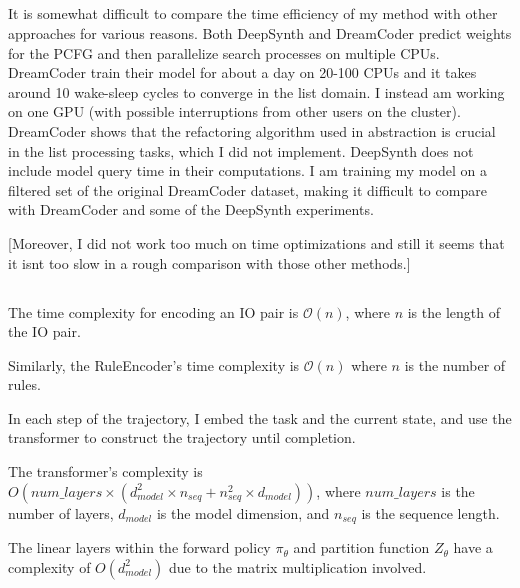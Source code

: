 \subsection{}
It is somewhat difficult to compare the time efficiency of my method with other approaches for various reasons. 
Both DeepSynth and DreamCoder predict weights for the PCFG and then parallelize search processes on multiple CPUs. DreamCoder train their model for about a day on 20-100 CPUs and it takes around 10 wake-sleep cycles to converge in the list domain. I instead am working on one GPU (with possible interruptions from other users on the cluster). DreamCoder shows that the refactoring algorithm used in abstraction is crucial in the list processing tasks, which I did not implement.
DeepSynth does not include model query time in their computations.
I am training my model on a filtered set of the original DreamCoder dataset, making it difficult to compare with DreamCoder and some of the DeepSynth experiments. 

[Moreover, I did not work too much on time optimizations and still it seems that it isnt too slow in a rough comparison with those other methods.]









\subsection{}


The time complexity for encoding an IO pair is \(\mathcal{O}(n)\), where \(n\) is the length of the IO pair. 

Similarly, the RuleEncoder's time complexity is \(\mathcal{O}(n)\) where \(n\) is the number of rules.

In each step of the trajectory, I embed the task and the current state, and use the transformer to construct the trajectory until completion. 

The transformer's complexity is \(O(num\_layers \times (d_{model}^2 \times n_{seq} + n_{seq}^2 \times d_{model}))\), where \(num\_layers\) is the number of layers, \(d_{model}\) is the model dimension, and \(n_{seq}\) is the sequence length.

The linear layers within the forward policy $\pi_\theta$ and partition function $Z_\theta$ have a complexity of \(O(d_{model}^2)\) due to the matrix multiplication involved.

